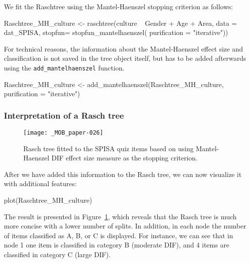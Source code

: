 \documentclass[doc,floatsintext,natbib]{apa7}
\begin{document}
We fit the Raschtree using the Mantel-Haenszel stopping criterion as follows:


\begin{Schunk}
\begin{Sinput}
 Raschtree_MH_culture <- raschtree(culture ~  Gender + Age + Area,
                                   data = dat_SPISA,
                                   stopfun= stopfun_mantelhaenszel(
                                     purification = "iterative"))
\end{Sinput}
\end{Schunk}

For technical reasons, the information about the Mantel-Haenszel effect size and classification is not saved in the tree object itself, but has to be added afterwards using the \texttt{add\_mantelhaenszel} function.

\begin{Schunk}
\begin{Sinput}
 Raschtree_MH_culture <- add_mantelhaenszel(Raschtree_MH_culture,
                                            purification = "iterative")
\end{Sinput}
\end{Schunk}


\subsubsection{Interpretation of a Rasch tree}


\begin{figure}%
\caption{Rasch tree fitted to the SPISA quiz items based on using Mantel-Haenszel DIF effect size measure as the stopping criterion.}
\texttt{[image: \_MOB\_paper-026]}
\label{fig:MHtree2}
\end{figure}%

After we have added this information to the Rasch tree, we can now visualize it with additional features: 

\begin{Schunk}
\begin{Sinput}
 plot(Raschtree_MH_culture)
\end{Sinput}
\end{Schunk}

The result is presented in Figure~\ref{fig:MHtree2}, which reveals that the Rasch tree is much more concise with a lower number of splits. In addition, in each node the number of items classified as A, B, or C is displayed. For instance, we can see that in node 1 one item is classified in category B (moderate DIF), and 4 items are classified in category C (large DIF).
\end{document}
